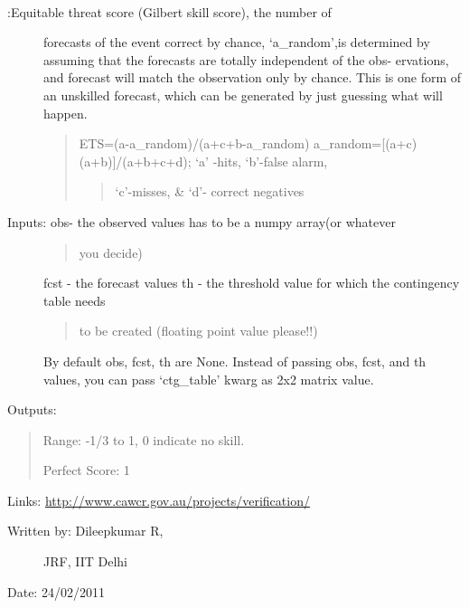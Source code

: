 \documentclass[letterpaper,10pt,english]{sphinxmanual}
\begin{document}

\begin{fulllineitems}
\label{diagnosis:ctgfunction.ets}~\begin{description}
\item[{{\hyperref[diagnosis:ctgfunction.ets]{}}:Equitable threat score (Gilbert skill score), the number of}] \leavevmode
forecasts of the event correct by chance, `a\_random',is determined
by assuming that the forecasts are totally independent of the obs-
ervations, and forecast will match the observation only by chance.
This is one form of an unskilled forecast, which can be generated
by just guessing what will happen.
\begin{quote}

ETS=(a-a\_random)/(a+c+b-a\_random)
a\_random={[}(a+c)(a+b){]}/(a+b+c+d); `a' -hits, `b'-false alarm,
\begin{quote}

`c'-misses, \& `d'- correct negatives
\end{quote}
\end{quote}

\item[{Inputs: obs- the observed values has to be a numpy array(or whatever}] \leavevmode\begin{quote}

you decide)
\end{quote}

fcst - the forecast values
th  - the threshold value for which the contingency table needs
\begin{quote}

to be created (floating point value please!!)
\end{quote}

By default obs, fcst, th are None. Instead of passing obs, fcst,
and th values, you can pass `ctg\_table' kwarg as 2x2 matrix value.

\end{description}

Outputs:
\begin{quote}

Range: -1/3 to 1, 0 indicate no skill.

Perfect Score: 1
\end{quote}

Links: \href{http://www.cawcr.gov.au/projects/verification/}{http://www.cawcr.gov.au/projects/verification/}
\begin{description}
\item[{Written by: Dileepkumar R,}] \leavevmode
JRF, IIT Delhi

\end{description}

Date: 24/02/2011

\end{fulllineitems}
\end{document}
